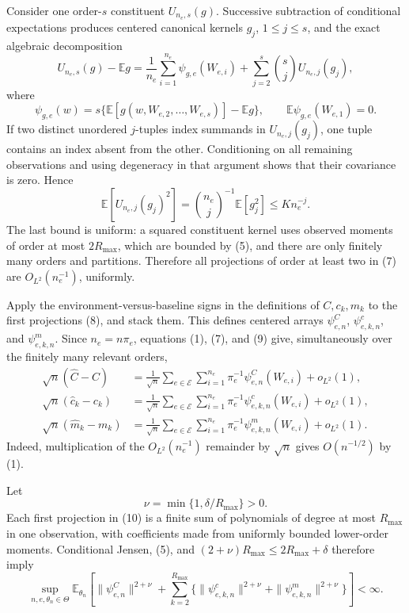 Consider one order-\(s\) constituent \(U_{n_e,s}(g)\).  Successive subtraction of conditional expectations produces centered canonical kernels \(g_j\), \(1\leq j\leq s\), and the exact algebraic decomposition
\[
 U_{n_e,s}(g)-\mathbb Eg
 =\frac1{n_e}\sum_{i=1}^{n_e}\psi_{g,e}(W_{e,i})
  +\sum_{j=2}^s {s\choose j}U_{n_e,j}(g_j), \tag{7}
\]
where
\[
 \psi_{g,e}(w)
 =s\{\mathbb E[g(w,W_{e,2},\ldots,W_{e,s})]-\mathbb Eg\},
 \qquad \mathbb E\psi_{g,e}(W_{e,1})=0. \tag{8}
\]
If two distinct unordered \(j\)-tuples index summands in \(U_{n_e,j}(g_j)\), one tuple contains an index absent from the other.  Conditioning on all remaining observations and using degeneracy in that argument shows that their covariance is zero.  Hence
\[
 \mathbb E\!\left[U_{n_e,j}(g_j)^2\right]
 ={n_e\choose j}^{-1}\mathbb E[g_j^2]
 \leq K n_e^{-j}. \tag{9}
\]
The last bound is uniform: a squared constituent kernel uses observed moments of order at most \(2R_{\max}\), which are bounded by (5), and there are only finitely many orders and partitions.  Therefore all projections of order at least two in (7) are \(O_{L^2}(n_e^{-1})\), uniformly.

Apply the environment-versus-baseline signs in the definitions of \(C,c_k,m_k\) to the first projections (8), and stack them.  This defines centered arrays \(\psi^C_{e,n}\), \(\psi^c_{e,k,n}\), and \(\psi^m_{e,k,n}\).  Since \(n_e=n\pi_e\), equations (1), (7), and (9) give, simultaneously over the finitely many relevant orders,
\[
 \begin{aligned}
 \sqrt n(\widehat C-C)
 &=\frac1{\sqrt n}\sum_{e\in\mathcal E}\sum_{i=1}^{n_e}
      \pi_e^{-1}\psi^C_{e,n}(W_{e,i})+o_{L^2}(1),\\
 \sqrt n(\widehat c_k-c_k)
 &=\frac1{\sqrt n}\sum_{e\in\mathcal E}\sum_{i=1}^{n_e}
      \pi_e^{-1}\psi^c_{e,k,n}(W_{e,i})+o_{L^2}(1),\\
 \sqrt n(\widehat m_k-m_k)
 &=\frac1{\sqrt n}\sum_{e\in\mathcal E}\sum_{i=1}^{n_e}
      \pi_e^{-1}\psi^m_{e,k,n}(W_{e,i})+o_{L^2}(1).
 \end{aligned} \tag{10}
\]
Indeed, multiplication of the \(O_{L^2}(n_e^{-1})\) remainder by \(\sqrt n\) gives \(O(n^{-1/2})\) by (1).

Let
\[
 \nu=\min\{1,\delta/R_{\max}\}>0. \tag{11}
\]
Each first projection in (10) is a finite sum of polynomials of degree at most \(R_{\max}\) in one observation, with coefficients made from uniformly bounded lower-order moments.  Conditional Jensen, (5), and
\((2+\nu)R_{\max}\leq2R_{\max}+\delta\) therefore imply
\[
 \sup_{n,e,\theta_n\in\Theta}\mathbb E_{\theta_n}\!\left[
 \|\psi^C_{e,n}\|^{2+\nu}
 +\sum_{k=2}^{R_{\max}}
 \{\|\psi^c_{e,k,n}\|^{2+\nu}
   +\|\psi^m_{e,k,n}\|^{2+\nu}\}\right]<\infty. \tag{12}
\]

